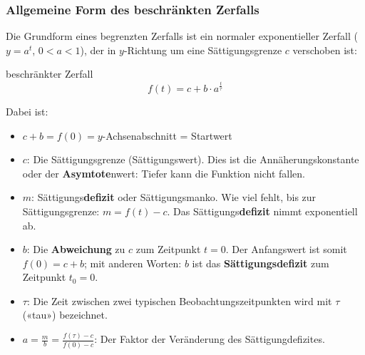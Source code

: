 \subsubsection{Allgemeine Form des beschränkten Zerfalls}
\begin{center}
\end{center}

Die Grundform eines begrenzten Zerfalls ist ein normaler
exponentieller Zerfall ($y=a^{t}$, $0<a<1$), der in $y$-Richtung um eine Sättigungsgrenze $c$ verschoben ist:

\begin{definition}{beschränkter Zerfall}{}
$$f(t) = c + b\cdot{}a^{\frac{t}{\tau}}$$
\end{definition}

Dabei ist:
\begin{itemize}
  \item $c+b = f(0) = y$-Achsenabschnitt = Startwert
	\item $c$: Die Sättigungsgrenze (Sättigungswert). Dies ist die Annäherungskonstante oder der \textbf{Asymtote}nwert: Tiefer kann die Funktion nicht fallen.

	\item $m$:  Sättigungs\textbf{defizit} oder Sättigungsmanko. Wie viel fehlt, bis zur
    Sättigungsgrenze: $m = f(t) - c$. Das Sättigungs\textbf{defizit} nimmt exponentiell ab.
	\item $b$: Die \textbf{Abweichung} zu $c$ zum Zeitpunkt $t=0$. Der
    Anfangswert ist somit $f(0) = c + b$; mit anderen Worten: $b$ ist das
    \textbf{Sättigungsdefizit} zum Zeitpunkt $t_0 = 0$.
	\item $\tau$: Die Zeit zwischen zwei typischen Beobachtungszeitpunkten wird
    mit $\tau$ («tau») bezeichnet.
    \item $a=\frac{m}{b}=\frac{f(\tau)-c}{f(0)-c}$: Der Faktor der Veränderung des
      Sättigungdefizites.
\end{itemize}

